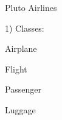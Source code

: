 Pluto Airlines

1) Classes\+:
\begin{DoxyItemize}
\item Airplane
\item Flight
\item Passenger
\item Luggage 
\end{DoxyItemize}